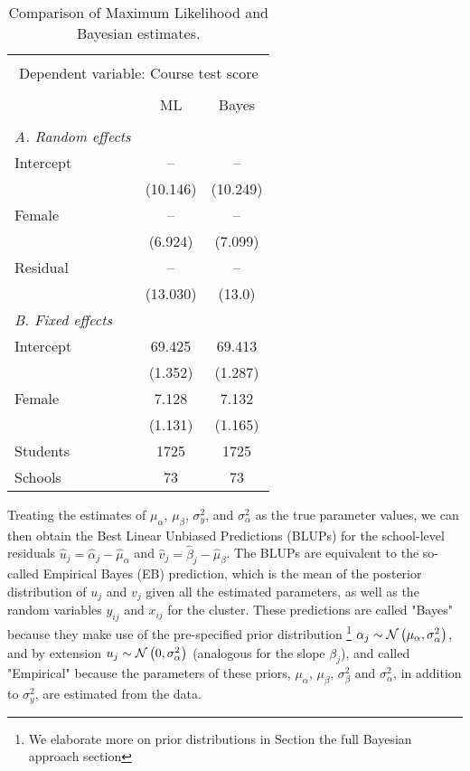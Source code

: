 \begin{table}[H]
	\centering
	\caption{{\small Comparison of Maximum Likelihood and Bayesian estimates.}}
	\label{}
	
	\smallskip
	\begin{tabular}{l*{2}{c}}
		\toprule \\[-1.0em]
		\multicolumn{3}{c}{Dependent variable: Course test score}\\ \\[-1.0em]
		&ML &Bayes\\
		\midrule \\[-1.0em]
		\emph{A. Random effects}\\
		Intercept & -- & --\\
		& (10.146) & (10.249)\\
		Female & -- & --\\
		& (6.924) & (7.099)\\
		Residual & -- & --\\
		& (13.030) & (13.0)\\
		\emph{B. Fixed effects} \\
		Intercept & 69.425 & 69.413\\
		& (1.352) & (1.287)\\
		Female & 7.128 & 7.132\\
		& (1.131) & (1.165)\\
		\hline
		Students&1725&1725\\
		Schools&73&73\\
		\bottomrule
		
	\end{tabular}
	\label{tab:results}
\end{table}
Treating the estimates of $\mu_\alpha$, $\mu_\beta$, $\sigma^2_{y}$, and $\sigma^2_{\alpha}$ as the true parameter values, we can then obtain the Best Linear Unbiased Predictions (BLUPs) for the school-level residuals $\hat{u}_j = \hat{\alpha}_{j} - \hat{\mu}_{\alpha}$ and $\hat{v}_j = \hat{\beta}_{j} - \hat{\mu}_{\beta}$. The BLUPs are equivalent to the so-called Empirical Bayes (EB) prediction, which is the mean of the posterior distribution of $u_{j}$ and $v_{j}$ given all the estimated parameters, as well as the random variables $y_{ij}$ and $x_{ij}$ for the cluster.  These predictions are called "Bayes" because they make use of the pre-specified prior distribution \footnote{We elaborate more on prior distributions in Section the full Bayesian approach section} $\alpha_j \sim \mathcal{N}\left(\mu_\alpha, \sigma^2_\alpha\right)$, and by extension $u_j \sim \mathcal{N}\left(0, \sigma^2_\alpha\right)$ (analogous for the slope $\beta_j$), and called "Empirical" because the parameters of these priors, $\mu_\alpha$, $\mu_\beta$,  $\sigma^2_{\beta}$ and $\sigma^2_{\alpha}$, in addition to $\sigma^2_{y}$, are estimated from the data.


